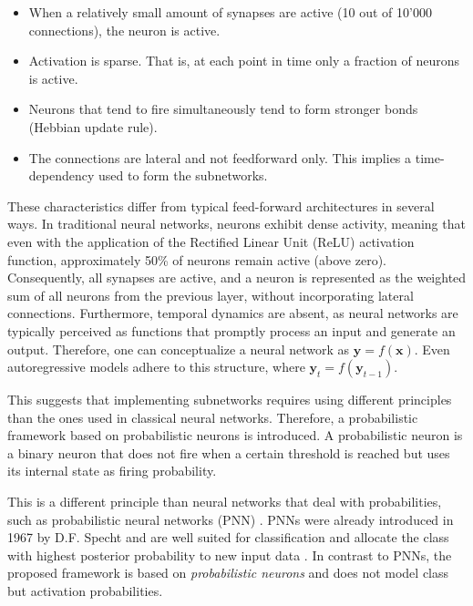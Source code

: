 \begin{itemize}
    \item When a relatively small amount of synapses are active (10 out of 10'000 connections), the neuron is active. 
    \item Activation is sparse. That is, at each point in time only a fraction of neurons is active.
    \item Neurons that tend to fire simultaneously tend to form stronger bonds (Hebbian update rule).
    \item The connections are lateral and not feedforward only. This implies a time-dependency used to form the subnetworks. 
\end{itemize}

These characteristics differ from typical feed-forward architectures in several ways.  In traditional neural networks, neurons exhibit dense activity, meaning that even with the application of the Rectified Linear Unit (ReLU) activation function, approximately 50\% of neurons remain active (above zero). Consequently, all synapses are active, and a neuron is represented as the weighted sum of all neurons from the previous layer, without incorporating lateral connections. Furthermore, temporal dynamics are absent, as neural networks are typically perceived as functions that promptly process an input and generate an output. Therefore, one can conceptualize a neural network as $\boldsymbol{y} = f(\boldsymbol{x})$. Even autoregressive models adhere to this structure, where $\boldsymbol{y}_t = f(\boldsymbol{y}_{t-1})$.

This suggests that implementing subnetworks requires using different principles than the ones used in classical neural networks. Therefore, a probabilistic framework based on probabilistic neurons is introduced.
A probabilistic neuron is a binary neuron that does not fire when a certain threshold is reached but uses its internal state as firing probability.

This is a different principle than neural networks that deal with probabilities, such as probabilistic neural networks (PNN) . PNNs were already introduced in 1967 by D.F. Specht \cite{Specht_1967, Specht_1990} and are well suited for classification and allocate the class with highest posterior probability to new input data \cite{Zeinali_Story_2017}.
In contrast to PNNs, the proposed framework is based on \emph{probabilistic neurons} and does not model class but activation probabilities.

